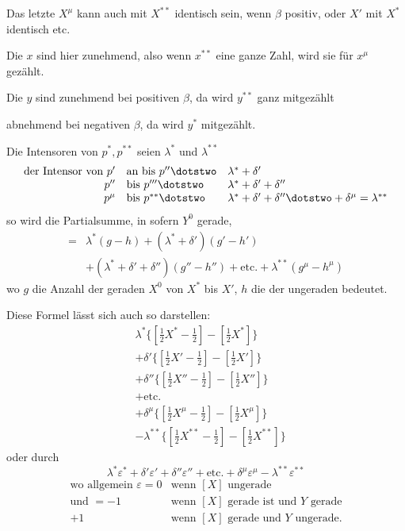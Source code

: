 Das letzte $X^\mu$ kann auch mit $X^{**}$ identisch sein, wenn $\beta$ positiv, oder $X'$ mit $X^*$ identisch etc.

Die $x$ sind hier zunehmend, also wenn $x^{**}$ eine ganze Zahl, wird sie für $x^\mu$ gezählt.

Die $y$ sind zunehmend bei positiven $\beta$, da wird $y^{**}$ ganz mitgezählt
\begin{center}abnehmend bei negativen $\beta$, da wird $y^*$ mitgezählt.\end{center}

Die Intensoren von $p^*,p^{**}$ seien $\lambda^*$ und $\lambda^{**}$
\[
\begin{array}{rll}
\text{der Intensor von }p'&\text{an bis }p''\dotstwo&\lambda^*+\delta'\\
p''&\text{bis }p'''\dotstwo&\lambda^*+\delta'+\delta''\\
p^\mu&\text{bis }p^{**}\dotstwo&\lambda^*+\delta'+\delta''\dotstwo+\delta^\mu=\lambda^{**}
\end{array}
\]
so wird die Partialsumme, in sofern $Y^0$ gerade,
\[
\begin{aligned}
={}&\lambda^*(g-h)+(\lambda^*+\delta')(g'-h')\\
&+(\lambda^*+\delta'+\delta'')(g''-h'')+\text{etc.}+\lambda^{**}(g^\mu-h^\mu)
\end{aligned}
\]
wo $g$ die Anzahl der geraden $X^0$ von $X^*$ bis $X'$, $h$ die der ungeraden bedeutet.

Diese Formel lässt sich auch so darstellen:
\[
\begin{aligned}
&\lambda^*\{[\tfrac12X^*-\tfrac12]-[\tfrac12X^*]\}\\
&+\delta'\{[\tfrac12X'-\tfrac12]-[\tfrac12X']\}\\
&+\delta''\{[\tfrac12X''-\tfrac12]-[\tfrac12X'']\}\\
&+\text{etc.}\\
&+\delta^\mu\{[\tfrac12X^\mu-\tfrac12]-[\tfrac12X^\mu]\}\\
&-\lambda^{**}\{[\tfrac12X^{**}-\tfrac12]-[\tfrac12X^{**}]\}
\end{aligned}
\]
oder durch
\[
\lambda^*\varepsilon^*+\delta'\varepsilon'+\delta''\varepsilon''+\text{etc.}+\delta^\mu\varepsilon^\mu-\lambda^{**}\varepsilon^{**}
\]
\[
\begin{array}{rll}
\text{wo allgemein }\varepsilon=0&\text{wenn }[X]\text{ ungerade}\\
\text{und }=-1&\text{wenn }[X]\text{ gerade ist und }Y\text{ gerade}\\
+1&\text{wenn }[X]\text{ gerade und }Y\text{ ungerade.}
\end{array}
\]

